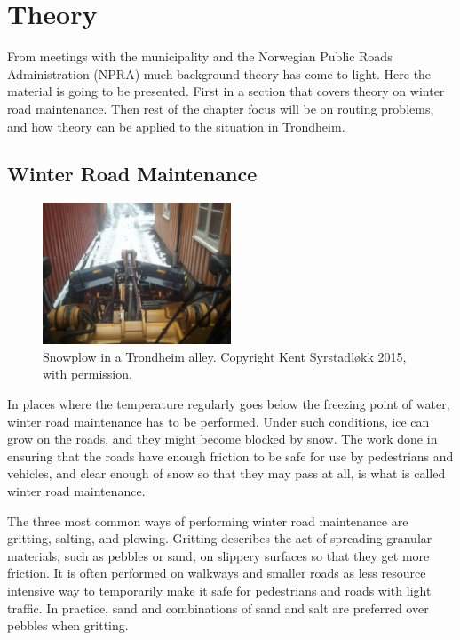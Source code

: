 \chapter{Theory}
\label{theory}

From meetings with the municipality and the Norwegian Public Roads Administration (NPRA) much background theory has come to light. Here the material is going to be presented. First in a section that covers theory on winter road maintenance. Then rest of the chapter focus will be on routing problems, and how theory can be applied to the situation in Trondheim.

\section{Winter Road Maintenance} %
\label{sec:snow_plowing}

\begin{figure}
    \begin{center}
        \includegraphics[width=0.5\textwidth]{figures/MachineryIllustrations/snowplow-Kent_Syrstadlokk-2012-04-18.jpg}
    \end{center}
    \caption{Snowplow in a Trondheim alley. Copyright Kent Syrstadløkk 2015, with permission.}
    \label{fig:snowplow_in_alley}
\end{figure}

In places where the temperature regularly goes below the freezing point of water, winter road maintenance has to be performed. Under such conditions, ice can grow on the roads, and they might become blocked by snow. The work done in ensuring that the roads have enough friction to be safe for use by pedestrians and vehicles, and clear enough of snow so that they may pass at all, is what is called winter road maintenance.

The three most common ways of performing winter road maintenance are gritting, salting, and plowing. Gritting describes the act of spreading granular materials, such as pebbles or sand, on slippery surfaces so that they get more friction. It is often performed on walkways and smaller roads as less resource intensive way to temporarily make it safe for pedestrians and roads with light traffic. In practice, sand and combinations of sand and salt are preferred over pebbles when gritting.

